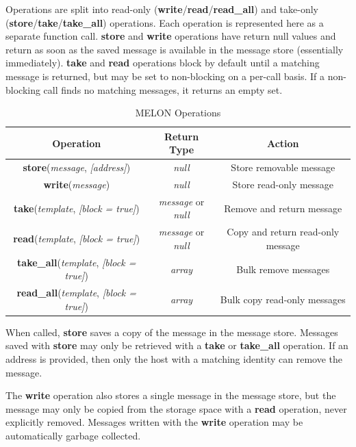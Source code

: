 \documentclass{llncs}
\begin{document}
Operations are split into read-only (\textbf{write}/\textbf{read}/\textbf{read\_all}) and take-only (\textbf{store}/\textbf{take}/\textbf{take\_all}) operations. Each operation is represented here as a separate function call. \textbf{store} and \textbf{write} operations have return null values and return as soon as the saved message is available in the message store (essentially immediately). \textbf{take} and \textbf{read} operations block by default until a matching message is returned, but may be set to non-blocking on a per-call basis. If a non-blocking call finds no matching messages, it returns an empty set.

\begin{table}
\centering
\begin{tabular}{|c|c|c|}
\hline
\textbf{Operation} & \textbf{Return Type} & \textbf{Action} \\ \hline
\textbf{store}(\textit{message}, \textit{[address]}) & \textit{null} & Store removable message \\ \hline
\textbf{write}(\textit{message}) & \textit{null} & Store read-only message \\ \hline
\textbf{take}(\textit{template}, \textit{[block = true]}) & \textit{message} or \textit{null} & Remove and return message \\ \hline
\textbf{read}(\textit{template}, \textit{[block = true]}) & \textit{message} or \textit{null} & Copy and return read-only message \\ \hline
\textbf{take\_all}(\textit{template}, \textit{[block = true]}) & \textit{array} & Bulk remove messages \\ \hline
\textbf{read\_all}(\textit{template}, \textit{[block = true]}) & \textit{array} & Bulk copy read-only messages \\ \hline
\end{tabular}
\caption{MELON Operations}
\end{table}

When called, \textbf{store} saves a copy of the message in the message store. Messages saved with \textbf{store} may only be retrieved with a \textbf{take} or \textbf{take\_all} operation. If an address is provided, then only the host with a matching identity can remove the message.

The \textbf{write} operation also stores a single message in the message store, but the message may only be copied from the storage space with a \textbf{read} operation, never explicitly removed. Messages written with the \textbf{write} operation may be automatically garbage collected.
\end{document}
